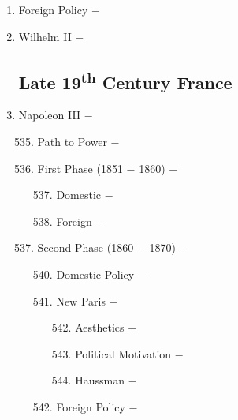 \documentclass[12pt]{article}
\begin{document}
\begin{enumerate}
\item Foreign Policy $-$ 

\item Wilhelm II $-$ 

\subsection{Late 19\textsuperscript{th} Century France}

\item Napoleon III $-$ 
\begin{enumerate}[label=\arabic{*}.]
\setcounter{enumii}{534}

\item Path to Power $-$ 

\item First Phase (1851 $-$ 1860) $-$ 

\begin{enumerate}[label=\arabic{*}.]
\setcounter{enumiii}{536}

\item Domestic $-$ 

\item Foreign $-$ 

\end{enumerate}
\setcounter{enumii}{538}

\item Second Phase (1860 $-$ 1870) $-$

\begin{enumerate}[label=\arabic{*}.]
\setcounter{enumiii}{539}

\item Domestic Policy $-$ 

\item New Paris $-$ 

\begin{enumerate}[label=\arabic{*}.]
\setcounter{enumiv}{541}

\item Aesthetics $-$ 

\item Political Motivation $-$ 

\item Haussman $-$ 

\end{enumerate}
\setcounter{enumiii}{544}

\item Foreign Policy $-$

\end{enumerate}
\end{enumerate}
\setcounter{enumi}{545}



\end{enumerate}
\end{document}

